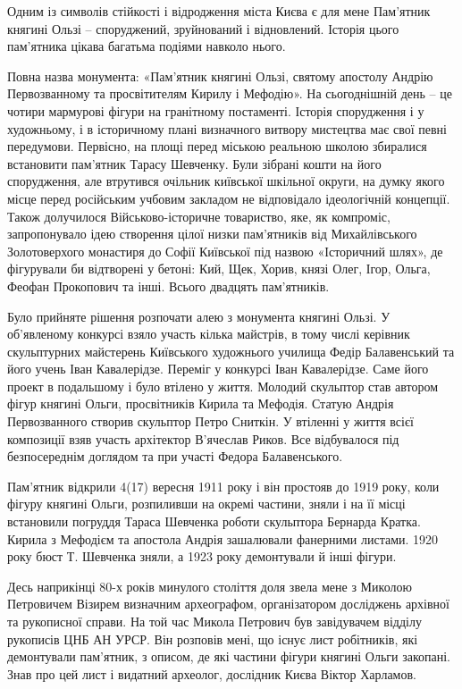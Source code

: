 Одним із символів стійкості і відродження міста Києва є для мене Пам'ятник
княгині Ользі – споруджений, зруйнований і відновлений. Історія цього
пам'ятника цікава багатьма подіями навколо нього.

Повна назва монумента: «Пам'ятник княгині Ользі, святому апостолу Андрію
Первозванному та просвітителям Кирилу і Мефодію». На сьогоднішній день – це
чотири мармурові фігури на гранітному постаменті. Історія спорудження і у
художньому, і в історичному плані визначного витвору мистецтва має свої певні
передумови. Первісно, на площі перед міською реальною школою збиралися
встановити пам'ятник Тарасу Шевченку. Були зібрані кошти на його спорудження,
але втрутився очільник київської шкільної округи, на думку якого місце перед
російським учбовим закладом не відповідало ідеологічній концепції. Також
долучилося Військово-історичне товариство, яке, як компроміс, запропонувало
ідею створення цілої низки пам'ятників від Михайлівського Золотоверхого
монастиря до Софії Київської під назвою «Історичний шлях», де фігурували би
відтворені у бетоні: Кий, Щек, Хорив, князі Олег, Ігор, Ольга, Феофан
Прокопович та інші. Всього двадцять пам'ятників.

Було прийняте рішення розпочати алею з монумента княгині Ользі. У об'явленому
конкурсі взяло участь кілька майстрів, в тому числі керівник скульптурних
майстерень Київського художнього училища Федір Балавенський та його учень Іван
Кавалерідзе. Переміг у конкурсі Іван Кавалерідзе. Саме його проект в подальшому
і було втілено у життя. Молодий скульптор став автором фігур княгині Ольги,
просвітників Кирила та Мефодія. Статую Андрія Первозванного створив скульптор
Петро Сниткін. У втіленні у життя всієї композиції взяв участь архітектор
В'ячеслав Риков. Все відбувалося під безпосереднім доглядом та при участі
Федора Балавенського.

Пам'ятник відкрили 4(17) вересня 1911 року і він простояв до 1919 року, коли
фігуру княгині Ольги, розпиливши на окремі частини, зняли і на її місці
встановили погруддя Тараса Шевченка роботи скульптора Бернарда Кратка. Кирила з
Мефодієм та апостола Андрія зашалювали фанерними листами. 1920 року бюст Т.
Шевченка зняли, а 1923 року демонтували й інші фігури.

Десь наприкінці 80-х років минулого століття доля звела мене з Миколою
Петровичем Візирем визначним археографом, організатором досліджень архівної та
рукописної справи. На той час Микола Петрович був завідувачем відділу рукописів
ЦНБ АН УРСР. Він розповів мені, що існує лист робітників, які демонтували
пам'ятник, з описом, де які частини фігури княгині Ольги закопані. Знав про цей
лист і видатний археолог, дослідник Києва Віктор Харламов.

